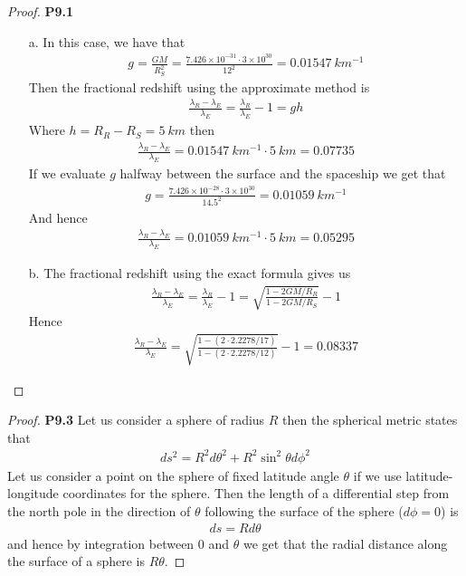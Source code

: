 \documentclass[11pt]{article}
\theoremstyle{definition}
\begin{document}
\begin{proof}{\textbf{P9.1}}
\begin{itemize}
    \item [a.]
    In this case, we have that
    \begin{align*}
        g = \frac{GM}{R_S^2}
        = \frac{7.426 \times 10^{-31} \cdot 3 \times 10^{30}}{12^2}
        = 0.01547~km^{-1}
    \end{align*}
    Then the fractional redshift using the approximate method is
    \begin{align*}
        \frac{\lambda_R - \lambda_E}{\lambda_E}
        = \frac{\lambda_R}{\lambda_E} - 1
        = gh
    \end{align*}
    Where $h = R_R - R_S = 5~km$ then
    \begin{align*}
        \frac{\lambda_R - \lambda_E}{\lambda_E} = 0.01547~km^{-1} \cdot 5~km
        = 0.07735
    \end{align*}
    If we evaluate $g$ halfway between the surface and the spaceship we get
    that
    \begin{align*}
        g = \frac{7.426 \times 10^{-28} \cdot 3 \times 10^{30}}{14.5^2}
        = 0.01059~km^{-1}
    \end{align*}
    And hence
    \begin{align*}
        \frac{\lambda_R - \lambda_E}{\lambda_E} = 0.01059~km^{-1} \cdot 5~km
        = 0.05295
    \end{align*}

    \item [b.] The fractional redshift using the exact formula gives us
    \begin{align*}
        \frac{\lambda_R - \lambda_E}{\lambda_E}
        = \frac{\lambda_R}{\lambda_E} - 1
        = \sqrt{\frac{1- 2GM/R_R}{1- 2GM/R_S}} - 1
    \end{align*}
    Hence
    \begin{align*}
        \frac{\lambda_R - \lambda_E}{\lambda_E}
        = \sqrt{\frac{1- (2\cdot 2.2278/17)}{1- (2\cdot 2.2278/12)}} - 1
        = 0.08337
    \end{align*}
\end{itemize}
\end{proof}
\cleardoublepage
\begin{proof}{\textbf{P9.3}}
    Let us consider a sphere of radius $R$ then the spherical metric states
    that
    \begin{align*}
        ds^2 = R^2d\theta^2 + R^2\sin^2\theta d\phi^2
    \end{align*}
    Let us consider a point on the sphere of fixed latitude angle $\theta$
    if we use latitude-longitude coordinates for the sphere.
    Then the length of a differential step from the north pole
    in the direction of $\theta$ following the surface of the sphere
    ($d\phi = 0$) is
    \begin{align*}
        ds = Rd\theta
    \end{align*}
    and hence by integration between $0$ and $\theta$ we get that the radial
    distance along the surface of a sphere is $R\theta$.
\end{proof}
\end{document}
